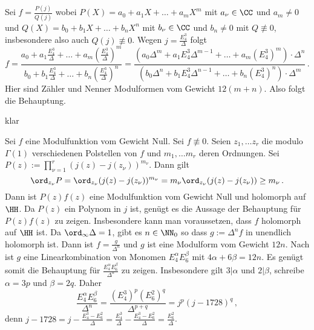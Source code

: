 \begin{bewe-list}
	\item[(iii) $\Rightarrow$ (ii)] Sei $f = \frac{P(j)}{Q(j)}$ wobei $P(X) = a_0 + a_1X + \ldots + a_mX^m$ mit $a_\nu \in \CC$ und $a_m \not= 0$ und $Q(X) = b_0 + b_1X + \ldots + b_nX^n$ mit $b_\nu \in \CC$ und $b_n \not= 0$ mit $Q \not\equiv 0$, insbesondere also auch $Q(j) \not\equiv 0$.
	Wegen $j = \frac{E_4^3}{\Delta}$ folgt
	\[
		f
		= \frac{a_0 + a_1\frac{E_4^3}{\Delta} + \ldots + a_m(\frac{E_4^3}{\Delta})^m}{b_0 + b_1\frac{E_4^3}{\Delta} + \ldots + b_n(\frac{E_4^3}{\Delta})^n}
		= \frac{(a_0\Delta^m + a_1E_4^3\Delta^{m-1} + \ldots + a_m(E_4^3)^m)\cdot \Delta^n}{(b_0\Delta^n + b_1E_4^3\Delta^{n-1} + \ldots + b_n(E_4^3)^n) \cdot \Delta^m}
		\,.
	\]
	Hier sind Zähler und Nenner Modulformen vom Gewicht $12(m+n)$.
	Also folgt die Behauptung.
	\item[(ii) $\Rightarrow$ (i)] klar
	\item[(i) $\Rightarrow$ (iii)] Sei $f$ eine Modulfunktion vom Gewicht Null.
	Sei $f \not\equiv 0$.
	Seien $z_1, \ldots z_r$ die modulo $\Gamma(1)$ verschiedenen Polstellen von $f$ und $m_1, \ldots m_r$ deren Ordnungen.
	Sei $P(z) := \prod_{\nu = 1}^r (j(z) - j(z_\nu))^{m_\nu}$.
	Dann gilt
	\[
		\ord_{z_\nu} P = \ord_{z_\nu} (j(z) - j(z_\nu))^{m_\nu} = m_\nu \ord_{z_\nu} (j(z) - j(z_\nu)) \geq m_\nu
		\,.
	\]
	Dann ist $P(z)f(z)$ eine Modulfunktion vom Gewicht Null und holomorph auf $\HH$.
	Da $P(z)$ ein Polynom in $j$ ist, genügt es die Aussage der Behauptung für $P(z)f(z)$ zu zeigen.
	Insbesondere kann man voraussetzen, dass $f$ holomorph auf $\HH$ ist.
	Da $\ord_\infty \Delta = 1$, gibt es $n\in\NN_0$ so dass $g := \Delta^nf$ in unendlich holomorph ist.
	Dann ist $f = \frac{g}{\Delta^n}$ und $g$ ist eine Modulform vom Gewicht $12n$.
	Nach  ist $g$ eine Linearkombination von Monomen $E_4^\alpha E_6^\beta$ mit $4\alpha + 6\beta = 12n$.
	Es genügt somit die Behauptung für $\frac{E_4^\alpha E_6^\beta}{\Delta^n}$ zu zeigen.
	Insbesondere gilt $3|\alpha$ und $2|\beta$, schreibe $\alpha = 3p$ und $\beta = 2q$.
	Daher
	\[
		\frac{E_4^\alpha E_6^\beta}{\Delta^n}
		= \frac{(E_4^3)^p (E_6^2)^q}{\Delta^{p+q}}
		= j^p (j-1728)^q
		\,,
	\]
	denn $j-1728 = j - \frac{E_4^3 - E_6^2}{\Delta} = \frac{E_4^3}{\Delta} - \frac{E_4^3-E_6^2}{\Delta} = \frac{E_6^2}{\Delta}$.
\end{bewe-list}

